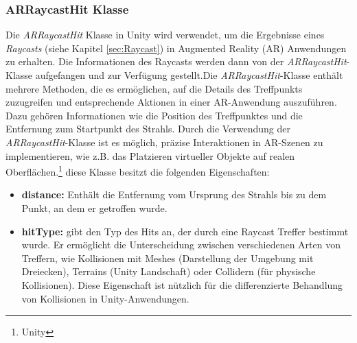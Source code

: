 \subsubsection{\label{sec:ARRaycastHit}ARRaycastHit Klasse}
Die \textit{ARRaycastHit} Klasse in Unity wird verwendet, um die Ergebnisse eines \textit{Raycasts} (siehe Kapitel \ref{sec:Raycast}) in Augmented Reality
(AR) Anwendungen zu erhalten. Die Informationen des Raycasts werden dann von der \textit{ARRaycastHit}-Klasse
aufgefangen und zur Verfügung gestellt.Die \textit{ARRaycastHit}-Klasse enthält mehrere Methoden, die es ermöglichen, auf
die Details des Treffpunkts zuzugreifen und entsprechende Aktionen in einer AR-Anwendung auszuführen. Dazu gehören Informationen
wie die Position des Treffpunktes und die Entfernung zum Startpunkt des Strahls. Durch die Verwendung der \textit{ARRaycastHit}-Klasse
ist es möglich, präzise Interaktionen in AR-Szenen zu implementieren, wie z.B. das Platzieren virtueller Objekte auf
realen Oberflächen.\protect\footnote{Unity\cite{ARRaycastHit}} diese Klasse besitzt die folgenden Eigenschaften:
\begin{itemize}
    \item \textbf{distance: } Enthält die Entfernung vom Ursprung des Strahls bis zu dem Punkt, an dem er getroffen wurde.

    \item \textbf{hitType: } gibt den Typ des Hits an, der durch eine Raycast Treffer bestimmt wurde. Er ermöglicht die Unterscheidung zwischen verschiedenen Arten von Treffern, wie Kollisionen mit Meshes (Darstellung der Umgebung mit Dreiecken), Terrains (Unity Landschaft) oder Collidern (für physische Kollisionen). Diese Eigenschaft ist nützlich für die differenzierte Behandlung von Kollisionen in Unity-Anwendungen.
\end{itemize}


